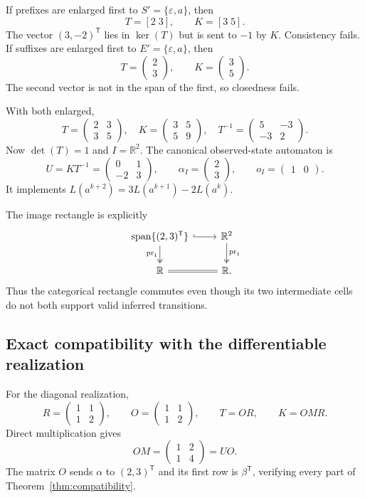 \documentclass[11pt]{article}
\theoremstyle{definition}
\newcommand{\R}{\mathbb R}
\begin{document}
If prefixes are enlarged first to $S'=\{\varepsilon,a\}$, then
\[
T=[2\;3],\qquad K=[3\;5].
\]
The vector $(3,-2)^{\mathsf T}$ lies in $\ker(T)$ but is sent to $-1$ by $K$.
Consistency fails. If suffixes are enlarged first to
$E'=\{\varepsilon,a\}$, then
\[
T=\begin{pmatrix}2\\3\end{pmatrix},
\qquad K=\begin{pmatrix}3\\5\end{pmatrix}.
\]
The second vector is not in the span of the first, so closedness fails.

With both enlarged,
\[
T=\begin{pmatrix}2&3\\3&5\end{pmatrix},
\quad
K=\begin{pmatrix}3&5\\5&9\end{pmatrix},
\quad
T^{-1}=\begin{pmatrix}5&-3\\-3&2\end{pmatrix}.
\]
Now $\det(T)=1$ and $I=\R^2$. The canonical observed-state automaton is
\[
U=KT^{-1}=\begin{pmatrix}0&1\\-2&3\end{pmatrix},
\qquad \alpha_I=\begin{pmatrix}2\\3\end{pmatrix},
\qquad o_I=\begin{pmatrix}1&0\end{pmatrix}.
\]
It implements $L(a^{k+2})=3L(a^{k+1})-2L(a^k)$.

The image rectangle is explicitly
\[
\begin{tikzcd}
\operatorname{span}\{(2,3)^{\mathsf T}\}
\arrow[r,hook]\arrow[d,two heads,"\mathrm{pr}_1"']&
\R^2\arrow[d,two heads,"\mathrm{pr}_1"]\\
\R\arrow[r,equal]&\R.
\end{tikzcd}
\]
Thus the categorical rectangle commutes even though its two intermediate
cells do not both support valid inferred transitions.

\subsection{Exact compatibility with the differentiable realization}
For the diagonal realization,
\[
R=\begin{pmatrix}1&1\\1&2\end{pmatrix},
\qquad
O=\begin{pmatrix}1&1\\1&2\end{pmatrix},
\qquad T=OR,\qquad K=OMR.
\]
Direct multiplication gives
\[
OM=\begin{pmatrix}1&2\\1&4\end{pmatrix}=UO.
\]
The matrix $O$ sends $\alpha$ to $(2,3)^{\mathsf T}$ and its first row is
$\beta^{\mathsf T}$, verifying every part of
Theorem~\ref{thm:compatibility}.
\end{document}
